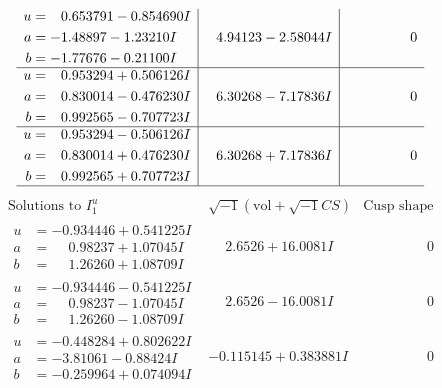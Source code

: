 \documentclass[1p]{elsarticle_modified}
\theoremstyle{definition}
\newcommand{\I}{\sqrt{-1}}
\begin{document}
$$\begin{array}{c|c|c}
\begin{aligned}
u &= \phantom{-}0.653791 - 0.854690 I \\
a &= -1.48897 - 1.23210 I \\
b &= -1.77676 - 0.21100 I\end{aligned}
 & \phantom{-}4.94123 - 2.58044 I & \phantom{-0.000000 } 0 \\ \hline\begin{aligned}
u &= \phantom{-}0.953294 + 0.506126 I \\
a &= \phantom{-}0.830014 - 0.476230 I \\
b &= \phantom{-}0.992565 - 0.707723 I\end{aligned}
 & \phantom{-}6.30268 - 7.17836 I & \phantom{-0.000000 } 0 \\ \hline\begin{aligned}
u &= \phantom{-}0.953294 - 0.506126 I \\
a &= \phantom{-}0.830014 + 0.476230 I \\
b &= \phantom{-}0.992565 + 0.707723 I\end{aligned}
 & \phantom{-}6.30268 + 7.17836 I & \phantom{-0.000000 } 0\\
 \hline 
 \end{array}$$\newpage$$\begin{array}{c|c|c}  
\text{Solutions to }I^u_{1}& \I (\text{vol} + \sqrt{-1}CS) & \text{Cusp shape}\\
 \hline 
\begin{aligned}
u &= -0.934446 + 0.541225 I \\
a &= \phantom{-}0.98237 + 1.07045 I \\
b &= \phantom{-}1.26260 + 1.08709 I\end{aligned}
 & \phantom{-}2.6526 + 16.0081 I & \phantom{-0.000000 } 0 \\ \hline\begin{aligned}
u &= -0.934446 - 0.541225 I \\
a &= \phantom{-}0.98237 - 1.07045 I \\
b &= \phantom{-}1.26260 - 1.08709 I\end{aligned}
 & \phantom{-}2.6526 - 16.0081 I & \phantom{-0.000000 } 0 \\ \hline\begin{aligned}
u &= -0.448284 + 0.802622 I \\
a &= -3.81061 - 0.88424 I \\
b &= -0.259964 + 0.074094 I\end{aligned}
 & -0.115145 + 0.383881 I & \phantom{-0.000000 } 0 \\ \hline\begin{aligned}

\end{aligned}
\end{array}$$
\end{document}
